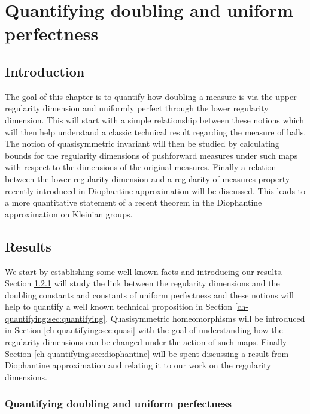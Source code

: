 \chapter{Quantifying doubling and uniform perfectness}
\label{chap:quantifying}


\section{Introduction}
\label{sec:intro-quantifying}


The goal of this chapter is to quantify how doubling a measure is via the upper regularity dimension and uniformly perfect through the lower regularity dimension. This will start with a simple relationship between these notions which will then help understand a classic technical result regarding the measure of balls. The notion of quasisymmetric invariant will then be studied by calculating bounds for the regularity dimensions of pushforward measures under such maps with respect to the dimensions of the original measures. Finally a relation between the lower regularity dimension and a regularity of measures property recently introduced in Diophantine approximation will be discussed. This leads to a more quantitative statement of a recent theorem in the Diophantine approximation on Kleinian groups.





\section{Results}\label{ch-quantifying:sec:results}

We start by establishing some well known facts and introducing our results. Section \ref{ch-quantifying:sec:equivalence} will study the link between the regularity dimensions and the doubling constants and constants of uniform perfectness and these notions will help to quantify a well known technical proposition in Section \ref{ch-quantifying:sec:quantifying}. Quasisymmetric homeomorphisms will be introduced in Section \ref{ch-quantifying:sec:quasi} with the goal of understanding how the regularity dimensions can be changed under the action of such maps. Finally Section \ref{ch-quantifying:sec:diophantine} will be spent discussing a result from Diophantine approximation and relating it to our work on the regularity dimensions.


\subsection{Quantifying doubling and uniform perfectness}\label{ch-quantifying:sec:equivalence}

